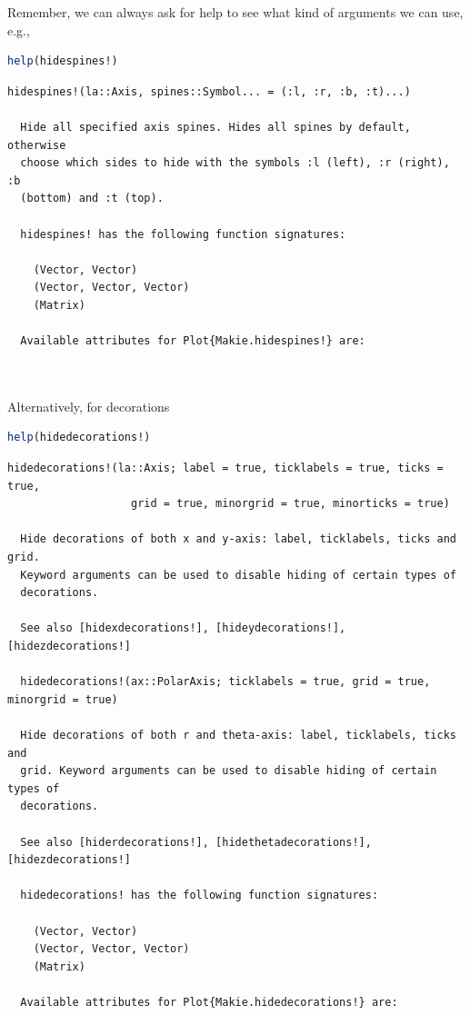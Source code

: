 \documentclass[
  notoc %
]{tufte-book}
\begin{document}
Remember, we can always ask for help to see what kind of arguments we
can use, e.g.,

\begin{lstlisting}[language=Julia]
help(hidespines!)
\end{lstlisting}

\begin{lstlisting}[language=Output]
  hidespines!(la::Axis, spines::Symbol... = (:l, :r, :b, :t)...)

  Hide all specified axis spines. Hides all spines by default, otherwise
  choose which sides to hide with the symbols :l (left), :r (right), :b
  (bottom) and :t (top).

  hidespines! has the following function signatures:

    (Vector, Vector)
    (Vector, Vector, Vector)
    (Matrix)

  Available attributes for Plot{Makie.hidespines!} are:

  
\end{lstlisting}

Alternatively, for decorations

\begin{lstlisting}[language=Julia]
help(hidedecorations!)
\end{lstlisting}

\begin{lstlisting}[language=Output]
  hidedecorations!(la::Axis; label = true, ticklabels = true, ticks = true,
                   grid = true, minorgrid = true, minorticks = true)

  Hide decorations of both x and y-axis: label, ticklabels, ticks and grid.
  Keyword arguments can be used to disable hiding of certain types of
  decorations.

  See also [hidexdecorations!], [hideydecorations!], [hidezdecorations!]

  hidedecorations!(ax::PolarAxis; ticklabels = true, grid = true, minorgrid = true)

  Hide decorations of both r and theta-axis: label, ticklabels, ticks and
  grid. Keyword arguments can be used to disable hiding of certain types of
  decorations.

  See also [hiderdecorations!], [hidethetadecorations!], [hidezdecorations!]

  hidedecorations! has the following function signatures:

    (Vector, Vector)
    (Vector, Vector, Vector)
    (Matrix)

  Available attributes for Plot{Makie.hidedecorations!} are:

  
\end{lstlisting}
\end{document}
